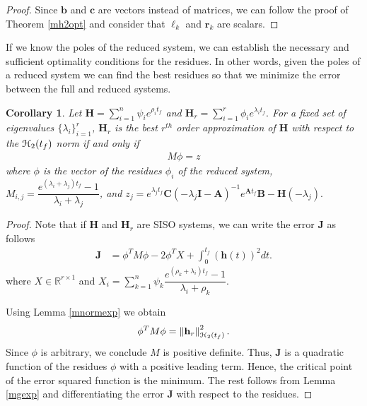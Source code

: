 \documentclass[preprint]{elsarticle}
\newtheorem{corollary}[theorem]{Corollary}
\theoremstyle{definition}
\theoremstyle{definition}
\newcommand{\bfb}{{\boldsymbol{b}}}
\newcommand{\bfc}{{\boldsymbol{c}}}
\def\mathcal{\EuScript}
\numberwithin{equation}{section}
\newcommand{\R}{\mathbb{R}}
\newcommand{\A}{\mathbf{A}}
\newcommand{\B}{\mathbf{B}}
\newcommand{\I}{\mathbf{I}}
\newcommand{\C}{\mathbf{C}}
\newcommand{\HH}{\mathbf{H}}
\newcommand{\J}{\mathbf{J}}
\newcommand{\h}{\mathbf{h}}
\newcommand{\tf}{t_f}
\newcommand{\rc}{\boldsymbol{r}}
\newcommand{\lc}{\boldsymbol{\ell}}
\newcommand{\ch}{\mathcal{H}}
\newcommand{\norm}[1]{\left\lVert#1\right\rVert}
\begin{document}
\begin{proof}
Since $\bfb$ and $\bfc$ are vectors instead of matrices, we can follow the proof of Theorem \ref{mh2opt} and consider that   $\lc_k$ and $\rc_k$ are scalars. 
\end{proof}

 If we know the poles of the reduced system, we can establish the necessary and sufficient optimality conditions for the residues. In other words, given the poles of a reduced system we can find the best residues so that we minimize the error between the full and reduced systems.

\begin{corollary}\label{optres}
Let $\HH=\sum_{i=1}^n \psi_ie^{\rho_i\tf}$  and $\HH_r=\sum_{i=1}^r \phi_ie^{\lambda_i\tf}.$ For a fixed set of eigenvalues $\{\lambda_i\}_{i=1}^r$,
$\HH_r$ is the best $r^{th}$ order approximation of $\HH$ with respect to the $\ch_2({\tf})$ norm if and only if 
\begin{align*}
M\phi=z
\end{align*}
where  $\phi$ is the vector of the residues $\phi_i$ of the reduced system, $M_{i,j}=\dfrac{e^{(\lambda_i+\lambda_j){\tf}}-1}{\lambda_i+\lambda_j}$, and %
$z_j=e^{\lambda_j{\tf}}\C(-\lambda_j\I-\A)^{-1}e^{\A {\tf}}\B-\HH(-\lambda_j).$
\end{corollary}
\begin{proof}
Note that if $\HH$ and $\HH_r$ are SISO systems, we can write the error $\J$ as follows
\begin{align*}
\J&= \phi^{T}M\phi - 2\phi^{T}X+\int_0^{\tf}(\h(t))^2dt  .
\end{align*}
where $X\in \R^{r\times 1}$ and $X_i=\sum_{k=1}^n \psi_k \dfrac{e^{(\rho_k+\lambda_i){\tf}}-1}{\lambda_i+\rho_k}.$

Using Lemma \ref{mnormexp} we obtain
\begin{align*}
\phi^{T}M\phi=\norm{\h_r}_{\ch_2({\tf})}^2.
\end{align*}
Since $\phi$ is arbitrary, we conclude $M$ is positive definite. Thus, $\J$ is a quadratic function of the residues $\phi$ with a positive leading term. Hence, the critical point of the error squared function is the minimum.
The rest follows from Lemma \ref{mgexp} and differentiating the error $\J$ with respect to the residues.
\end{proof}
\end{document}
